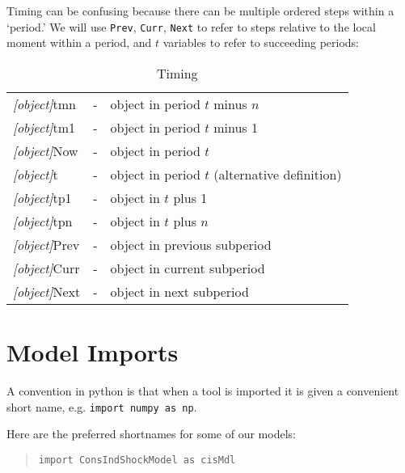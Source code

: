 \documentclass[12pt]{\econtex}
\begin{document}
\hypertarget{Timing}{}
Timing can be confusing because there can be multiple ordered steps 
within a `period.'  We will use \texttt{Prev}, \texttt{Curr}, \texttt{Next} to refer
to steps relative to the local moment within a period, and $t$ variables to refer to succeeding periods:
\begin{table}[ht]
  \centering 
  \begin{tabular}{|>{\ttfamily}lcl|} 		
    \hline
    \textit{[object]}tmn & - & object in period $t$ minus $n$
    \\ \textit{[object]}tm1 & - & object in period $t$ minus 1 
    \\ \textit{[object]}Now & - & object in period $t$
    \\ \textit{[object]}t\phantom{p1}   & - & object in period $t$ (alternative definition)
    \\ \textit{[object]}tp1 & - & object in $t$ plus 1 
    \\ \textit{[object]}tpn & - & object in $t$ plus $n$ 
    \\ \textit{[object]}Prev & - & object in previous subperiod
    \\ \textit{[object]}Curr & - & object in current subperiod
    \\ \textit{[object]}Next & - & object in next subperiod
    \\	\hline
  \end{tabular}
  \caption{Timing}
  \label{table:Timing}
\end{table}	

\section{Model Imports}

A convention in python is that when a tool is imported it is given a convenient short name,
e.g. \texttt{import numpy as np}.

Here are the preferred shortnames for some of our models:

\begin{quote}
  \texttt{import ConsIndShockModel as cisMdl}
\end{quote}

\clearpage

\vfill\eject\pagebreak\newpage 

\pagebreak
\end{document}
